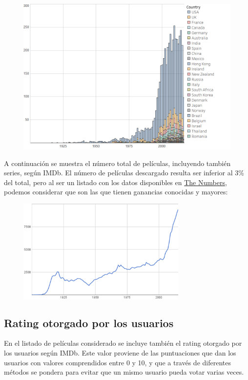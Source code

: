 \documentclass{article}
\begin{document}
\begin{figure}[h]
\centering
\includegraphics[width=4.5in,clip,keepaspectratio]{./images/films_per_year.png}
\label{fig:kaggle_num_films_per_year}
\end{figure}

A continuación se muestra el número total de películas, incluyendo también series, según IMDb\cite{quora}. El número de películas descargado resulta ser inferior al 3\% del total, pero al ser un listado con los datos disponibles en \href{http://www.the-numbers.com/movie/budgets/all}{The Numbers}, podemos considerar que son las que tienen ganancias conocidas y mayores:

\begin{figure}[h]
\centering
\includegraphics[width=3.3in,clip,keepaspectratio]{./images/total_movies_imdb}
\end{figure}

\subsection{Rating otorgado por los usuarios}

En el listado de películas considerado se incluye también el rating otorgado por los usuarios según IMDb. Este valor proviene de las puntuaciones que dan los usuarios con valores comprendidos entre 0 y 10, y que a través de diferentes métodos se pondera para evitar que un mismo usuario pueda votar varias veces.
\end{document}
